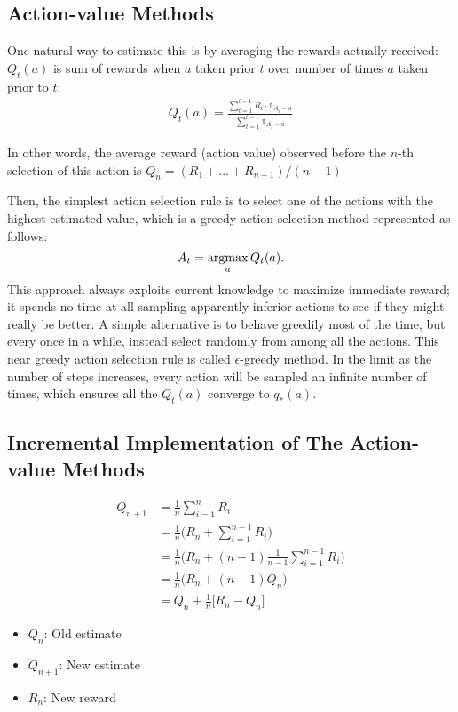 \subsection{Action-value Methods}

One natural way to estimate this is by averaging the rewards actually received: $Q_t(a)$ is sum of rewards when $a$ taken prior $t$ over number of times $a$ taken prior to $t$:
\begin{align*}
	Q_t(a) = \frac{\sum_{t=1}^{t-1}R_i \cdot \mathds{1}_{A_i=a}}{\sum_{t=1}^{t-1}\mathds{1}_{A_i=a}}
\end{align*}

In other words, the average reward (action value) observed before the $n$-th selection of this action is $Q_n = (R_1+\dots+R_{n-1})/(n-1)$

Then, the simplest action selection rule is to select one of the actions with the highest estimated value, which is a greedy action selection method represented as follows:
$$A_t=\operatorname*{\operatorname{argmax}}_{a}Q_t(a).$$
This approach always exploits current knowledge to maximize immediate reward; it spends no time at all sampling apparently inferior actions to see if they might really be better. A simple alternative is to behave greedily most of the time, but every once in a while, instead select randomly from among all the actions. This near greedy action selection rule is called $\epsilon$-greedy method. In the limit as the number of steps increases, every action will be sampled an infinite number of times, which ensures all the $Q_t(a)$ converge to $q_*(a)$.

\subsection{Incremental Implementation of The Action-value Methods}
\begin{align*}
	Q_{n+1} &= \frac{1}{n}\sum_{i=1}^{n}R_i\\
	&= \frac{1}{n} \Bigg(R_n + \sum_{i=1}^{n-1}R_i \Bigg)\\
	&= \frac{1}{n} \Bigg(R_n + (n-1)\frac{1}{n-1} \sum_{i=1}^{n-1}R_i \Bigg)\\
	&= \frac{1}{n} \Bigg(R_n + (n-1)Q_n \Bigg)\\
	&=  Q_n + \frac{1}{n} \Big[R_n - Q_n \Big]
\end{align*}
\begin{itemize}
	\item $Q_n$: Old estimate
	\item $Q_{n+1}$: New estimate
	\item $R_{n}$: New reward
\end{itemize}


